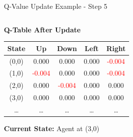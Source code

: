 \documentclass[aspectratio=169]{beamer}
\begin{document}
\begin{frame}{Q-Value Update Example - Step 5}
    
    \begin{columns}
        \begin{column}{0.45\textwidth}
            \textbf{Q-Table After Update}
            \small
            \begin{table}[h]
                \centering
                \begin{tabular}{|c|c|c|c|c|}
                    \hline
                    \textbf{State} & \textbf{Up} & \textbf{Down} & \textbf{Left} & \textbf{Right} \\
                    \hline
                    (0,0) & 0.000 & 0.000 & 0.000 & \textcolor{red}{-0.004} \\
                    (1,0) & \textcolor{red}{-0.004} & 0.000 & 0.000 & \textcolor{red}{-0.004} \\
                    (2,0) & 0.000 & \textcolor{red}{-0.004} & 0.000 & 0.000 \\
                    (3,0) & 0.000 & 0.000 & 0.000 & 0.000 \\
                    \dots & \dots & \dots & \dots & \dots \\
                    \hline
                \end{tabular}
            \end{table}
            
            \textbf{Current State:} Agent at (3,0)


        \end{column}
        

\end{columns}
\end{frame}
\end{document}
